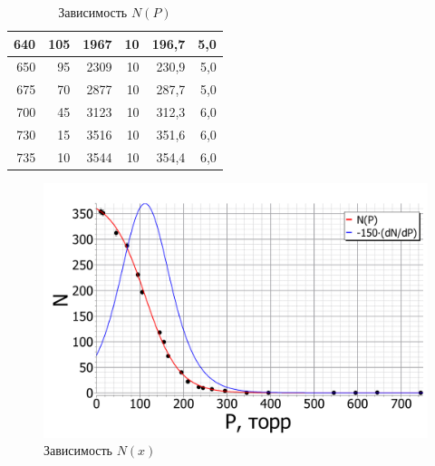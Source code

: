\begin{enumerate}
\begin{table}[h!]
\begin{tabular}{|r|r|r|r|r|r|}
					640                                               & 105                                                        & 1967                       & 10                          & 196,7                              & 5,0                                       \\ \hline
					650                                               & 95                                                         & 2309                       & 10                          & 230,9                              & 5,0                                       \\ \hline
					675                                               & 70                                                         & 2877                       & 10                          & 287,7                              & 5,0                                       \\ \hline
					700                                               & 45                                                         & 3123                       & 10                          & 312,3                              & 6,0                                       \\ \hline
					730                                               & 15                                                         & 3516                       & 10                          & 351,6                              & 6,0                                       \\ \hline
					735                                               & 10                                                         & 3544                       & 10                          & 354,4                              & 6,0                                       \\ \hline
				\end{tabular}
			\caption{Зависимость $N(P)$}
			\label{AlphaParticles_N(P)}
		\end{table}
	
	
		\begin{figure}[h!]
			\centering
			\includegraphics[width=\linewidth]{Pictures/Scintillation_PlotNoFit.pdf}
			\caption{Зависимость $N(x)$}
		\end{figure}
	

\end{enumerate}
